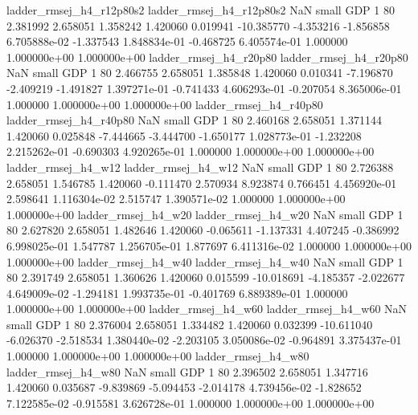 ladder_rmsej_h4_r12p80s2 ladder_rmsej_h4_r12p80s2                   NaN      small      GDP                 1 80 2.381992       2.658051 1.358242       1.420060    0.019941    -10.385770     -4.353216    -1.856858   6.705888e-02 -1.337543 1.848834e-01    -0.468725   6.405574e-01            1.000000    1.000000e+00        1.000000e+00
  ladder_rmsej_h4_r20p80   ladder_rmsej_h4_r20p80                   NaN      small      GDP                 1 80 2.466755       2.658051 1.385848       1.420060    0.010341     -7.196870     -2.409219    -1.491827   1.397271e-01 -0.741433 4.606293e-01    -0.207054   8.365006e-01            1.000000    1.000000e+00        1.000000e+00
  ladder_rmsej_h4_r40p80   ladder_rmsej_h4_r40p80                   NaN      small      GDP                 1 80 2.460168       2.658051 1.371144       1.420060    0.025848     -7.444665     -3.444700    -1.650177   1.028773e-01 -1.232208 2.215262e-01    -0.690303   4.920265e-01            1.000000    1.000000e+00        1.000000e+00
     ladder_rmsej_h4_w12      ladder_rmsej_h4_w12                   NaN      small      GDP                 1 80 2.726388       2.658051 1.546785       1.420060   -0.111470      2.570934      8.923874     0.766451   4.456920e-01  2.598641 1.116304e-02     2.515747   1.390571e-02            1.000000    1.000000e+00        1.000000e+00
     ladder_rmsej_h4_w20      ladder_rmsej_h4_w20                   NaN      small      GDP                 1 80 2.627820       2.658051 1.482646       1.420060   -0.065611     -1.137331      4.407245    -0.386992   6.998025e-01  1.547787 1.256705e-01     1.877697   6.411316e-02            1.000000    1.000000e+00        1.000000e+00
     ladder_rmsej_h4_w40      ladder_rmsej_h4_w40                   NaN      small      GDP                 1 80 2.391749       2.658051 1.360626       1.420060    0.015599    -10.018691     -4.185357    -2.022677   4.649009e-02 -1.294181 1.993735e-01    -0.401769   6.889389e-01            1.000000    1.000000e+00        1.000000e+00
     ladder_rmsej_h4_w60      ladder_rmsej_h4_w60                   NaN      small      GDP                 1 80 2.376004       2.658051 1.334482       1.420060    0.032399    -10.611040     -6.026370    -2.518534   1.380440e-02 -2.203105 3.050086e-02    -0.964891   3.375437e-01            1.000000    1.000000e+00        1.000000e+00
     ladder_rmsej_h4_w80      ladder_rmsej_h4_w80                   NaN      small      GDP                 1 80 2.396502       2.658051 1.347716       1.420060    0.035687     -9.839869     -5.094453    -2.014178   4.739456e-02 -1.828652 7.122585e-02    -0.915581   3.626728e-01            1.000000    1.000000e+00        1.000000e+00
